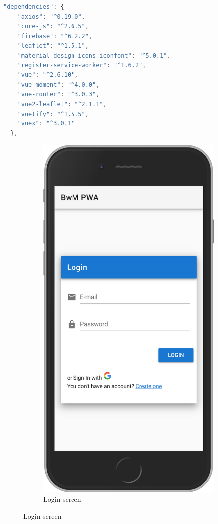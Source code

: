\begin{lstlisting}[language=JavaScript, caption=All final npm dependencies in packages.json, label=lst:packages]
"dependencies": {
    "axios": "^0.19.0",
    "core-js": "^2.6.5",
    "firebase": "^6.2.2",
    "leaflet": "^1.5.1",
    "material-design-icons-iconfont": "^5.0.1",
    "register-service-worker": "^1.6.2",
    "vue": "^2.6.10",
    "vue-moment": "^4.0.0",
    "vue-router": "^3.0.3",
    "vue2-leaflet": "^2.1.1",
    "vuetify": "^1.5.5",
    "vuex": "^3.0.1"
  },
\end{lstlisting}

\begin{figure}
  \centering
  \begin{subfigure}{.5\textwidth}
    \centering
    \includegraphics[width=.7\linewidth]{img/screen01}
    \caption{Login screen}
    \label{fig:sub1}
  \end{subfigure}%

\end{figure}
